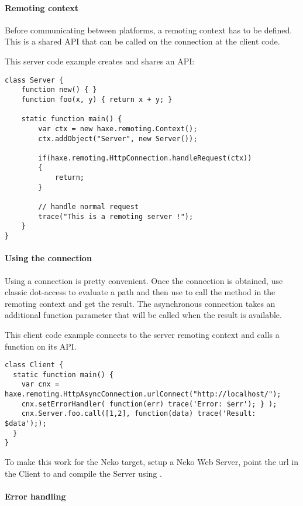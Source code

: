 \paragraph{Remoting context}

Before communicating between platforms, a remoting context has to be defined. This is a shared API that can be called on the connection at the client code.

This server code example creates and shares an API:
\begin{lstlisting}
class Server {
	function new() { }
	function foo(x, y) { return x + y; }

	static function main() {
		var ctx = new haxe.remoting.Context();
		ctx.addObject("Server", new Server());
		
		if(haxe.remoting.HttpConnection.handleRequest(ctx))
		{
			return;
		}
		
		// handle normal request
		trace("This is a remoting server !");
	} 
}
\end{lstlisting}

\paragraph{Using the connection}

Using a connection is pretty convenient. Once the connection is obtained, use classic dot-access to evaluate a path and then use  to call the method in the remoting context and get the result.
The asynchronous connection takes an additional function parameter that will be called when the result is available.

This client code example connects to the server remoting context and calls a function  on its API.
\begin{lstlisting}
class Client {
  static function main() {
    var cnx = haxe.remoting.HttpAsyncConnection.urlConnect("http://localhost/");
    cnx.setErrorHandler( function(err) trace('Error: $err'); } );
    cnx.Server.foo.call([1,2], function(data) trace('Result: $data'););
  }
}
\end{lstlisting}

To make this work for the Neko target, setup a Neko Web Server, point the url in the Client to  and compile the Server using .

\paragraph{Error handling}

